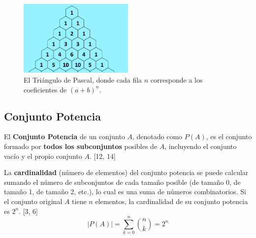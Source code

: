 \documentclass[12pt, letterpaper]{article}
\begin{document}
\begin{figure}[h!]
    \centering
    \includegraphics[width=0.5\textwidth]{pascal}
    \caption{El Triángulo de Pascal, donde cada fila $n$ corresponde a los coeficientes de $(a+b)^n$.}
    \label{fig:pascaltrig}
\end{figure}


\subsection{Conjunto Potencia}
El \textbf{Conjunto Potencia} de un conjunto $A$, denotado como $P(A)$, es el conjunto formado por \textbf{todos los subconjuntos} posibles de $A$, incluyendo el conjunto vacío y el propio conjunto $A$. [12, 14]

La \textbf{cardinalidad} (número de elementos) del conjunto potencia se puede calcular sumando el número de subconjuntos de cada tamaño posible (de tamaño 0, de tamaño 1, de tamaño 2, etc.), lo cual es una suma de números combinatorios. Si el conjunto original $A$ tiene $n$ elementos, la cardinalidad de su conjunto potencia es $2^n$. [3, 6]
\[ |P(A)| = \sum_{k=0}^{n} \binom{n}{k} = 2^n \]
\end{document}
